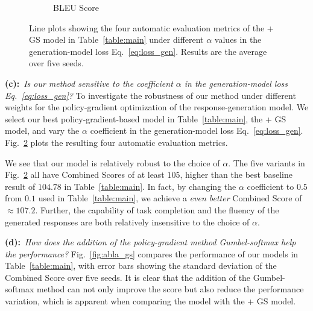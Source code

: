 \begin{figure}[tb]
\begin{subfigure}[b]{0.24\textwidth}
         \captionsetup{font=small}
         \vspace{-6mm}
         \caption{\footnotesize{BLEU Score}}
         \label{fig:vary_alpha_bleu}
     \end{subfigure}
     \vspace{-3mm}
     \captionsetup{font=small}
        \caption{ 
        Line plots showing the four automatic evaluation metrics of the \rewardnet + GS model in Table~\ref{table:main} under different $\alpha$ values in the generation-model loss Eq.~\eqref{eq:loss_gen}.
        Results are the average over five seeds.
        }
        \label{fig:vary_alpha}
        \vspace{-5mm}
\end{figure}

\textbf{(c):}~\textit{Is our method sensitive to the coefficient $\alpha$ in the generation-model loss Eq.~\eqref{eq:loss_gen}?}
To investigate the robustness of our method under different weights for the policy-gradient optimization of the response-generation model.
We select our best policy-gradient-based model in Table~\ref{table:main}, the \rewardnet + GS model, and vary the $\alpha$ coefficient in the generation-model loss Eq.~\eqref{eq:loss_gen}.
Fig.~\ref{fig:vary_alpha} plots the resulting four automatic evaluation metrics.

We see that our model is relatively robust to the choice of $\alpha$.
The five variants in Fig.~\ref{fig:vary_alpha} all have Combined Scores of at least $105$, higher than the best baseline result of $104.78$ in Table~\ref{table:main}.
In fact, by changing the $\alpha$ coefficient  to $0.5$ from $0.1$ used in Table~\ref{table:main}, we achieve a \emph{even better} Combined Score of $\approx 107.2$.
Further, the capability of task completion and the fluency of the generated responses are both relatively insensitive to the choice of $\alpha$.

\textbf{(d):}~\textit{How does the addition of the policy-gradient method Gumbel-softmax help the performance?}
Fig.~\ref{fig:abla_gs} compares the performance of our models in Table~\ref{table:main}, with error bars showing the standard deviation of the Combined Score over five seeds.
It is clear that the addition of the Gumbel-softmax method can not only improve the score but also reduce the performance variation, which is apparent when comparing the \rewardmle model with the \rewardmle + GS model.

